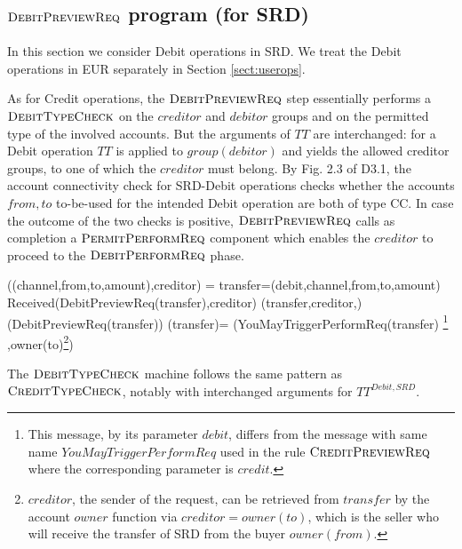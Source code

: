 \subsection{$\hbox{\sc DebitPreviewReq}$ program (for SRD)}
\label{sect:debitpreview}

In this section we consider Debit operations in SRD. We treat the Debit operations in EUR separately in Section \ref{sect:userops}.

As for Credit operations, the $\hbox{\sc DebitPreviewReq}$ step 
essentially performs a $\hbox{\sc DebitTypeCheck}$ on the 
$creditor$ and $debitor$ groups and on the permitted type of 
the involved accounts. But the arguments of $TT$ are interchanged: for a Debit operation $TT$ is applied to  $group(debitor)$ and yields the allowed creditor groups, to one of which the $creditor$ must belong. By Fig. 2.3 of D3.1, the account connectivity check for SRD-Debit operations checks whether the accounts $from,to$ to-be-used for the intended Debit operation are both of type CC. In case the outcome of the two checks is positive, $\hbox{\sc DebitPreviewReq}$ calls as completion a $\hbox{\sc PermitPerformReq}$ component which enables the $creditor$ to proceed to the $\hbox{\sc DebitPerformReq}$ phase. 


\begin{asm}
((channel,from,to,amount),creditor)  =\+
  \LET transfer=(debit,channel,from,to,amount)\\
  \IF Received(DebitPreviewReq(transfer),\FROM creditor) \THEN \+   
          (transfer,creditor,)\\
      (DebitPreviewReq(transfer)) \-
\WHERE \+
(transfer)=\+
(YouMayTriggerPerformReq(transfer)
\footnote{This message,  by its parameter $debit$, differs 
	from the message with same name $YouMayTriggerPerformReq$ used in the rule $\hbox{\sc CreditPreviewReq}$ where the corresponding parameter is $credit$.}
,\TO  owner(to)\footnote{$creditor$, the sender of the 
	request, can be retrieved from $transfer$ by the account $owner$ function via $creditor=owner(to)$, which is the seller who will receive the transfer of SRD from the buyer $owner(from)$.}) 
\end{asm}

The $\hbox{\sc DebitTypeCheck}$ machine follows the same pattern as $\hbox{\sc CreditTypeCheck}$, notably with interchanged arguments for $TT^{Debit,SRD}$. 


